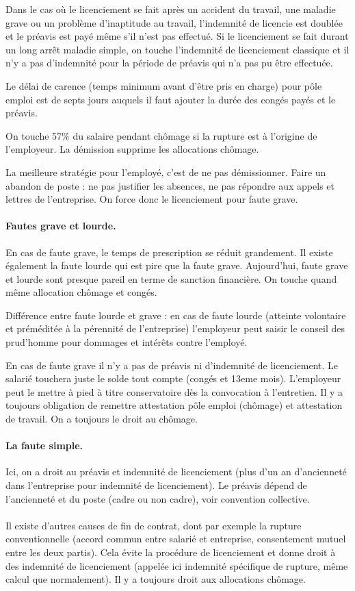Dans le cas où le licenciement se fait après un accident du travail, une maladie grave ou un problème d'inaptitude au travail, l'indemnité de licencie est doublée et le préavis est payé même s'il n'est pas effectué.
Si le licenciement se fait durant un long arrêt maladie simple, on touche l'indemnité de licenciement classique et il n'y a pas d'indemnité pour la période de préavis qui n'a pas pu être effectuée.

Le délai de carence (temps minimum avant d'être pris en charge) pour pôle emploi est de septs jours auquels il faut ajouter la durée des congés payés et le préavis.

On touche 57\% du salaire pendant chômage si la rupture est à l’origine de l’employeur.
La démission supprime les allocations chômage.

La meilleure stratégie pour l’employé, c’est de ne pas démissionner.
Faire un abandon de poste : ne pas justifier les absences, ne pas répondre aux appels et lettres de l’entreprise.
On force donc le licenciement pour faute grave.


\paragraph{Fautes grave et lourde.}
En cas de faute grave, le temps de prescription se réduit grandement.
Il existe également la faute lourde qui est pire que la faute grave.
Aujourd’hui, faute grave et lourde sont presque pareil en terme de sanction financière.
On touche quand même allocation chômage et congés.

Différence entre faute lourde et grave : en cas de faute lourde (atteinte volontaire et préméditée à la pérennité de l'entreprise) l’employeur peut saisir le conseil des prud’homme pour dommages et intérêts contre l’employé.

En cas de faute grave il n'y a pas de préavis ni d’indemnité de licenciement. Le salarié touchera juste le solde tout compte (congés et 13eme mois).
L’employeur peut le mettre à pied à titre conservatoire dès la convocation à l’entretien.
Il y a toujours obligation de remettre attestation pôle emploi (chômage) et attestation de travail.
On a toujours le droit au chômage.


\paragraph{La faute simple.}
Ici, on a droit au préavis et indemnité de licenciement (plus d’un an d’ancienneté dans l’entreprise pour indemnité de licenciement).
Le préavis dépend de l’ancienneté et du poste (cadre ou non cadre), voir convention collective.


\paragraph{}
Il existe d’autres causes de fin de contrat, dont par exemple la rupture conventionnelle (accord commun entre salarié et entreprise, consentement mutuel entre les deux partis).
Cela évite la procédure de licenciement et donne droit à des indemnité de licenciement (appelée ici indemnité spécifique de rupture, même calcul que normalement).
Il y a toujours droit aux allocations chômage.

